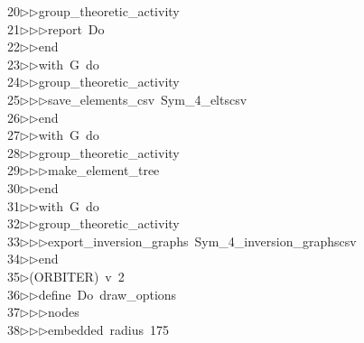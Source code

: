\begin{tabbing}
20\>$\triangleright$\>$\triangleright$\>group\_theoretic\_activity\ \\[0pt]
21\>$\triangleright$\>$\triangleright$\>$\triangleright$\>report\ Do\ \\[0pt]
22\>$\triangleright$\>$\triangleright$\>end\ \\[0pt]
23\>$\triangleright$\>$\triangleright$\>with\ G\ do\ \\[0pt]
24\>$\triangleright$\>$\triangleright$\>group\_theoretic\_activity\ \\[0pt]
25\>$\triangleright$\>$\triangleright$\>$\triangleright$\>save\_elements\_csv\ Sym\_4\_eltscsv\ \\[0pt]
26\>$\triangleright$\>$\triangleright$\>end\ \\[0pt]
27\>$\triangleright$\>$\triangleright$\>with\ G\ do\ \\[0pt]
28\>$\triangleright$\>$\triangleright$\>group\_theoretic\_activity\ \\[0pt]
29\>$\triangleright$\>$\triangleright$\>$\triangleright$\>make\_element\_tree\ \\[0pt]
30\>$\triangleright$\>$\triangleright$\>end\ \\[0pt]
31\>$\triangleright$\>$\triangleright$\>with\ G\ do\ \\[0pt]
32\>$\triangleright$\>$\triangleright$\>group\_theoretic\_activity\ \\[0pt]
33\>$\triangleright$\>$\triangleright$\>$\triangleright$\>export\_inversion\_graphs\ Sym\_4\_inversion\_graphscsv\ \\[0pt]
34\>$\triangleright$\>$\triangleright$\>end\\[0pt]
35\>$\triangleright$\>(ORBITER)\ v\ 2\ \\[0pt]
36\>$\triangleright$\>$\triangleright$\>define\ Do\ draw\_options\ \\[0pt]
37\>$\triangleright$\>$\triangleright$\>$\triangleright$\>nodes\ \\[0pt]
38\>$\triangleright$\>$\triangleright$\>$\triangleright$\>embedded\ radius\ 175\ \\[0pt]

\end{tabbing}
